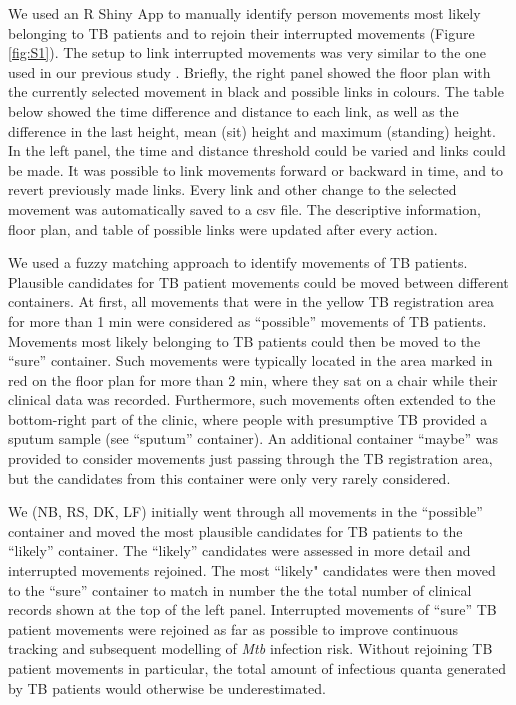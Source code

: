 \documentclass[11pt]{article}
\begin{document}
We used an R Shiny App to manually identify person movements most likely belonging to TB patients and to rejoin their interrupted movements (Figure \ref{fig:S1}). The setup to link interrupted movements was very similar to the one used in our previous study \cite{banholzer2025PLOSComputBiol}. Briefly, the right panel showed the floor plan with the currently selected movement in black and possible links in colours. The table below showed the time difference and distance to each link, as well as the difference in the last height, mean (sit) height and maximum (standing) height. In the left panel, the time and distance threshold could be varied and links could be made. It was possible to link movements forward or backward in time, and to revert previously made links. Every link and other change to the selected movement was automatically saved to a csv file. The descriptive information, floor plan, and table of possible links were updated after every action.

We used a fuzzy matching approach to identify movements of TB patients. Plausible candidates for TB patient movements could be moved between different containers. At first, all movements that were in the yellow TB registration area for more than 1 min were considered as ``possible'' movements of TB patients. Movements most likely belonging to TB patients could then be moved to the ``sure'' container. Such movements were typically located in the area marked in red on the floor plan for more than 2 min, where they sat on a chair while their clinical data was recorded. Furthermore, such movements often extended to the bottom-right part of the clinic, where people with presumptive TB provided a sputum sample (see ``sputum'' container). An additional container ``maybe'' was provided to consider movements just passing through the TB registration area, but the candidates from this container were only very rarely considered.

We (NB, RS, DK, LF) initially went through all movements in the ``possible'' container and moved the most plausible candidates for TB patients to the ``likely'' container. The ``likely'' candidates were assessed in more detail and interrupted movements rejoined. The most ``likely" candidates were then moved to the ``sure'' container to match in number the the total number of clinical records shown at the top of the left panel. Interrupted movements of ``sure'' TB patient movements were rejoined as far as possible to improve continuous tracking and subsequent modelling of \emph{Mtb} infection risk. Without rejoining TB patient movements in particular, the total amount of infectious quanta generated by TB patients would otherwise be underestimated.
\end{document}

